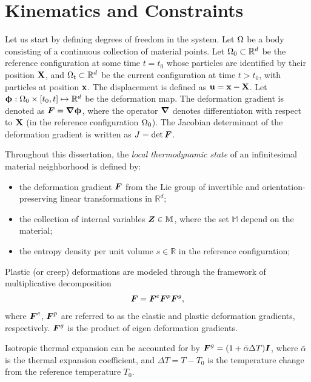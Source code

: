 \section{Kinematics and Constraints}
\label{section: Chapter2/kinematics}

Let us start by defining degrees of freedom in the system. Let $\Omega$ be a body consisting of a continuous collection of material points. Let $\Omega_0 \subset \mathbb{R}^d$ be the reference configuration at some time $t = t_0$ whose particles are identified by their position $\textbf{X}$, and $\Omega_t \subset \mathbb{R}^d$ be the current configuration at time $t > t_0$, with particles at position $\textbf{x}$. The displacement is defined as $\textbf{u} = \textbf{x} - \textbf{X}$.
Let $\boldsymbol{\upphi}: \Omega_0 \times [t_0, t] \mapsto \mathbb{R}^d$ be the deformation map.
The deformation gradient is denoted as $\boldsymbol{F} = \boldsymbol{\nabla} \boldsymbol{\upphi}$, where the operator $\boldsymbol{\nabla}$ denotes differentiaton with respect to $\textbf{X}$ (in the reference configuration $\Omega_0$). The Jacobian determinant of the deformation gradient is written as $J = \det\boldsymbol{F}$.

Throughout this dissertation, the \emph{local thermodynamic state} of an infinitesimal material neighborhood is defined by:
\begin{itemize}
  \item the deformation gradient $\boldsymbol{F}$ from the Lie group of invertible and orientation-preserving linear transformations in $\mathbb{R}^d$;
  \item the collection of internal variables $\boldsymbol{Z} \in \mathbb{M}$, where the set $\mathbb{M}$ depend on the material;
  \item the entropy density per unit volume $s \in \mathbb{R}$ in the reference configuration;
\end{itemize}

Plastic (or creep) deformations are modeled through the framework of multiplicative decomposition
\begin{align}
  \boldsymbol{F} = \boldsymbol{F}^e \boldsymbol{F}^p \boldsymbol{F}^g,
\end{align}
where $\boldsymbol{F}^e$, $\boldsymbol{F}^p$ are referred to as the elastic and plastic deformation gradients, respectively. $\boldsymbol{F}^g$ is the product of eigen deformation gradients.

\begin{example}
  Isotropic thermal expansion can be accounted for by $\boldsymbol{F}^g = (1+\bar{\alpha} \Delta T)\boldsymbol{I}$, where $\bar{\alpha}$ is the thermal expansion coefficient, and $\Delta T = T - T_0$ is the temperature change from the reference temperature $T_0$.
\end{example}

